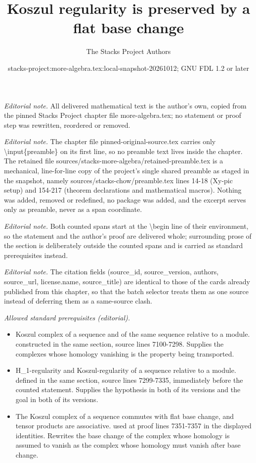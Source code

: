 \documentclass[10pt,a4paper]{amsart}
\title{Koszul regularity is preserved by a flat base change}
\author{The Stacks Project Authors}
\date{stacks-project:more-algebra.tex:local-snapshot-20261012; GNU FDL 1.2 or later}
\theoremstyle{plain}
\theoremstyle{definition}
\theoremstyle{remark}
\numberwithin{equation}{subsection}
\begin{document}
\maketitle
\setcounter{subsection}{1}
\noindent\textit{Editorial note.} All delivered mathematical text is the author's own, copied from the pinned Stacks Project chapter file more-algebra.tex; no statement or proof step was rewritten, reordered or removed.\par\medskip
\noindent\textit{Editorial note.} The chapter file pinned-original-source.tex carries only \textbackslash{}input\{preamble\} on its first line, so no preamble text lives inside the chapter. The retained file sources/stacks-more-algebra/retained-preamble.tex is a mechanical, line-for-line copy of the project's single shared preamble as staged in the snapshot, namely sources/stacks-chow/preamble.tex lines 14-18 (Xy-pic setup) and 154-217 (theorem declarations and mathematical macros). Nothing was added, removed or redefined, no package was added, and the excerpt serves only as preamble, never as a span coordinate.\par\medskip
\noindent\textit{Editorial note.} Both counted spans start at the \textbackslash{}begin line of their environment, so the statement and the author's proof are delivered whole; surrounding prose of the section is deliberately outside the counted spans and is carried as standard prerequisites instead.\par\medskip
\noindent\textit{Editorial note.} The citation fields (source\_id, source\_version, authors, source\_url, license.name, source\_title) are identical to those of the cards already published from this chapter, so that the batch selector treats them as one source instead of deferring them as a same-source clash.\par\medskip
\noindent\textit{Allowed standard prerequisites (editorial).}\begin{itemize}
\item Koszul complex of a sequence and of the same sequence relative to a module. constructed in the same section, source lines 7100-7298. Supplies the complexes whose homology vanishing is the property being transported.
\item H\_1-regularity and Koszul-regularity of a sequence relative to a module. defined in the same section, source lines 7299-7335, immediately before the counted statement. Supplies the hypothesis in both of its versions and the goal in both of its versions.
\item The Koszul complex of a sequence commutes with flat base change, and tensor products are associative. used at proof lines 7351-7357 in the displayed identities. Rewrites the base change of the complex whose homology is assumed to vanish as the complex whose homology must vanish after base change.
\end{itemize}\medskip
\end{document}
